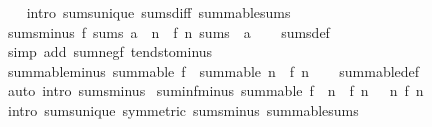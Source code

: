 \begin{isabellebody}
%
\isadelimproof
\ \ %
\endisadelimproof
%
\isatagproof
{}\isamarkupfalse%
\ {\isacharparenleft}{\kern0pt}intro\ sums{\isacharunderscore}{\kern0pt}unique\ sums{\isacharunderscore}{\kern0pt}diff\ summable{\isacharunderscore}{\kern0pt}sums{\isacharparenright}{\kern0pt}%
\endisatagproof
{\isafoldproof}%
%
\isadelimproof
\isanewline
%
\endisadelimproof
\isanewline
{}\isamarkupfalse%
\ sums{\isacharunderscore}{\kern0pt}minus{\isacharcolon}{\kern0pt}\ {\isachardoublequoteopen}f\ sums\ a\ {\isasymLongrightarrow}\ {\isacharparenleft}{\kern0pt}{\isasymlambda}n{\isachardot}{\kern0pt}\ {\isacharminus}{\kern0pt}\ f\ n{\isacharparenright}{\kern0pt}\ sums\ {\isacharparenleft}{\kern0pt}{\isacharminus}{\kern0pt}\ a{\isacharparenright}{\kern0pt}{\isachardoublequoteclose}\isanewline
%
\isadelimproof
\ \ %
\endisadelimproof
%
\isatagproof
{}\isamarkupfalse%
\ sums{\isacharunderscore}{\kern0pt}def\ \isamarkupfalse%
\ {\isacharparenleft}{\kern0pt}simp\ add{\isacharcolon}{\kern0pt}\ sum{\isacharunderscore}{\kern0pt}negf\ tendsto{\isacharunderscore}{\kern0pt}minus{\isacharparenright}{\kern0pt}%
\endisatagproof
{\isafoldproof}%
%
\isadelimproof
\isanewline
%
\endisadelimproof
\isanewline
{}\isamarkupfalse%
\ summable{\isacharunderscore}{\kern0pt}minus{\isacharcolon}{\kern0pt}\ {\isachardoublequoteopen}summable\ f\ {\isasymLongrightarrow}\ summable\ {\isacharparenleft}{\kern0pt}{\isasymlambda}n{\isachardot}{\kern0pt}\ {\isacharminus}{\kern0pt}\ f\ n{\isacharparenright}{\kern0pt}{\isachardoublequoteclose}\isanewline
%
\isadelimproof
\ \ %
\endisadelimproof
%
\isatagproof
{}\isamarkupfalse%
\ summable{\isacharunderscore}{\kern0pt}def\ \isamarkupfalse%
\ {\isacharparenleft}{\kern0pt}auto\ intro{\isacharcolon}{\kern0pt}\ sums{\isacharunderscore}{\kern0pt}minus{\isacharparenright}{\kern0pt}%
\endisatagproof
{\isafoldproof}%
%
\isadelimproof
\isanewline
%
\endisadelimproof
\isanewline
{}\isamarkupfalse%
\ suminf{\isacharunderscore}{\kern0pt}minus{\isacharcolon}{\kern0pt}\ {\isachardoublequoteopen}summable\ f\ {\isasymLongrightarrow}\ {\isacharparenleft}{\kern0pt}{\isasymSum}n{\isachardot}{\kern0pt}\ {\isacharminus}{\kern0pt}\ f\ n{\isacharparenright}{\kern0pt}\ {\isacharequal}{\kern0pt}\ {\isacharminus}{\kern0pt}\ {\isacharparenleft}{\kern0pt}{\isasymSum}n{\isachardot}{\kern0pt}\ f\ n{\isacharparenright}{\kern0pt}{\isachardoublequoteclose}\isanewline
%
\isadelimproof
\ \ %
\endisadelimproof
%
\isatagproof
{}\isamarkupfalse%
\ {\isacharparenleft}{\kern0pt}intro\ sums{\isacharunderscore}{\kern0pt}unique\ {\isacharbrackleft}{\kern0pt}symmetric{\isacharbrackright}{\kern0pt}\ sums{\isacharunderscore}{\kern0pt}minus\ summable{\isacharunderscore}{\kern0pt}sums{\isacharparenright}{\kern0pt}%

\end{isabellebody}
